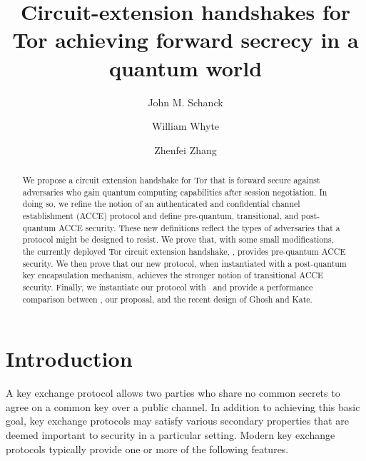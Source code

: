 \documentclass[USenglish,oneside,twocolumn]{article}
\theoremstyle{dgthm}
\theoremstyle{dgdef}
\newcommand{\ntor}{{\sf {ntor}}}
\newcommand{\ntrue}{{\sf{NTRUEncrypt}}}
\begin{document}
  \author*[1]{John M. Schanck}
  \author[2]{William Whyte}
  \author[3]{Zhenfei Zhang}



  \journalyear{}


\title{Circuit-extension handshakes for Tor achieving forward secrecy in a quantum world}

\begin{abstract}
  {We propose a circuit extension handshake for Tor that is forward secure
  against adversaries who gain quantum computing capabilities after session
  negotiation. In doing so, we refine the notion of an authenticated and
  confidential channel establishment (ACCE) protocol and define pre-quantum,
  transitional, and post-quantum ACCE security. These new definitions reflect
  the types of adversaries that a protocol might be designed to resist. We
  prove that, with some small modifications, the currently deployed Tor circuit
  extension handshake, \ntor, provides pre-quantum ACCE
  security. We then prove that our new protocol, when instantiated with a
  post-quantum key encapsulation mechanism, achieves the stronger notion of
  transitional ACCE security.  Finally, we instantiate our protocol with
  \ntrue~and provide a performance comparison between \ntor, our proposal,
  and the recent design of Ghosh and Kate.}
\end{abstract}

\maketitle

\section{Introduction}
  A key exchange protocol allows two parties who share no common secrets to
  agree on a common key over a public channel. In addition to achieving this
  basic goal, key exchange protocols may satisfy various secondary properties
  that are deemed important to security in a particular setting. Modern key
  exchange protocols typically provide one or more of the following features.
\end{document}
